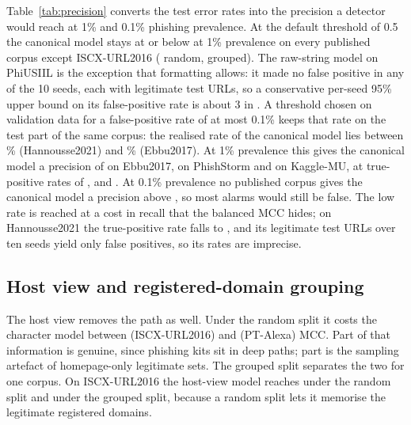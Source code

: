 Table~\ref{tab:precision} converts the test error rates into the precision a detector would reach at 1\% and 0.1\% phishing prevalence. At the default threshold of 0.5 the canonical model stays at or below \PrecOneEbbuRandomCharCanon{} at 1\% prevalence on every published corpus except ISCX-URL2016 (\PrecOneISCXURLRandomCharCanon{} random, \PrecOneISCXURLDomainCharCanon{} grouped). The raw-string model on PhiUSIIL is the exception that formatting allows: it made no false positive in any of the 10 seeds, each with \NLegTestPhiUSIIL{} legitimate test URLs, so a conservative per-seed 95\% upper bound on its false-positive rate is about 3 in \NLegTestPhiUSIIL. A threshold chosen on validation data for a false-positive rate of at most 0.1\% keeps that rate on the test part of the same corpus: the realised rate of the canonical model lies between \VFprHannousseCharCanon\% (Hannousse2021) and \VFprEbbuCharCanon\% (Ebbu2017). At 1\% prevalence this gives the canonical model a precision of \VPrecOneEbbuCharCanon{} on Ebbu2017, \VPrecOnePhishStormCharCanon{} on PhishStorm and \VPrecOneKaggleMUCharCanon{} on Kaggle-MU, at true-positive rates of \VTprEbbuCharCanon, \VTprPhishStormCharCanon{} and \VTprKaggleMUCharCanon. At 0.1\% prevalence no published corpus gives the canonical model a precision above \VPrecTenthISCXURLCharCanon, so most alarms would still be false. The low rate is reached at a cost in recall that the balanced MCC hides; on Hannousse2021 the true-positive rate falls to \VTprHannousseCharCanon, and its \VNZeroHannousseCharCanon{} legitimate test URLs over ten seeds yield only \VFPHannousseCharCanon{} false positives, so its rates are imprecise.







\subsection{Host view and registered-domain grouping}
\label{sec:domain}
The host view removes the path as well. Under the random split it costs the character model between \DRawVsHostISCXURL{} (ISCX-URL2016) and \DRawVsHostPTAlexa{} (PT-Alexa) MCC. Part of that information is genuine, since phishing kits sit in deep paths; part is the sampling artefact of homepage-only legitimate sets. The grouped split separates the two for one corpus. On ISCX-URL2016 the host-view model reaches \WISCXURLRandomCharHost{} under the random split and \WISCXURLDomainCharHost{} under the grouped split, because a random split lets it memorise the \RegLegitISCXURL{} legitimate registered domains.

